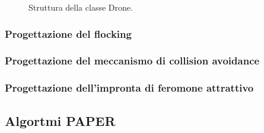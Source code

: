 \begin{figure}[H] 
    \captionsetup{justification=centering, margin=2cm, font=footnotesize}
    \begin{center}
    \end{center}
    \caption[short]{Struttura della classe Drone.}
    \label{classe_drone}
\end{figure}

\subsubsection{Progettazione del flocking}

\subsubsection{Progettazione del meccanismo di collision avoidance}

\subsubsection{Progettazione dell'impronta di feromone attrattivo}

\subsection{Algortmi PAPER}